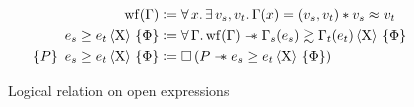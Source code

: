 \begin{figure}[tp]
    \begin{align*}
    		\wf{\datalangBisubst}
    		&\coloneqq
    		\forall \datalangVar \ldotp
    		\exists \datalangVal_s, \datalangVal_t \ldotp
    		\datalangBisubst (\datalangVar) = (\datalangVal_s, \datalangVal_t) \iSep
    		\datalangVal_s \iSimilar \datalangVal_t
    	\\
    		\iRsimv[\iProt]{\iPred}{\datalangExpr_s}{\datalangExpr_t}
    		&\coloneqq
    		\forall \datalangBisubst \ldotp
    		\wf{\datalangBisubst} \iSepImp
    		\iSimv[\iProt]{\iPred}{\datalangBisubst_s (\datalangExpr_s)}{\datalangBisubst_t (\datalangExpr_t)}
    	\\
    	   \iRsimvHoare[\iProt]{P}{\iPred}{\datalangExpr_s}{\datalangExpr_t}
    	   &\coloneqq
    	   \iPersistent \left( P \iSepImp \iRsimv[\iProt]{\iPred}{\datalangExpr_s}{\datalangExpr_t} \right)
    \end{align*}
    \caption{Logical relation on open expressions}
    \label{fig:rsim}
\end{figure}